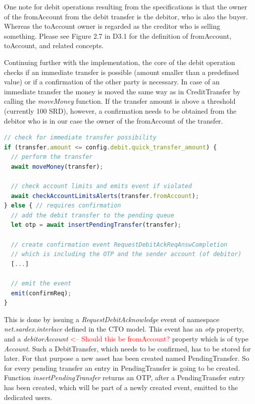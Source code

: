 One note for debit operations resulting from the specifications is that the owner of the fromAccount from the debit transfer is the debitor, who is also the buyer. Whereas the toAccount owner is regarded as the creditor who is selling something. Please see Figure 2.7 in D3.1 \cite{INTERLACE_D31} for the definition of fromAccount, toAccount, and related concepts.

Continuing further with the implementation, the core of the debit operation checks if an immediate transfer is possible (amount smaller than a predefined value) or if a confirmation of the other party is necessary. In case of an immediate transfer the money is moved the same way as in CreditTransfer by calling the \textit{moveMoney} function. If the transfer amount is above a threshold (currently 100 SRD), however, a confirmation needs to be obtained from the debitor who is in our case the owner of the fromAccount of the transfer.

\begin{center}
\begin{minipage}{0.8\textwidth}
\small
\begin{lstlisting}[language=javascript,firstnumber=1,caption={\bf\small DebitTransfer JavaScript}, captionpos=b,label=lst:js-debittransfer]
// check for immediate transfer possibility
if (transfer.amount <= config.debit.quick_transfer_amount) {
  // perform the transfer
  await moveMoney(transfer);

  // check account limits and emits event if violated
  await checkAccountLimitsAlerts(transfer.fromAccount);
} else { // requires confirmation
  // add the debit transfer to the pending queue
  let otp = await insertPendingTransfer(transfer);

  // create confirmation event RequestDebitAckReqAnswCompletion
  // which is including the OTP and the sender account (of debitor)
  [...]

  // emit the event
  emit(confirmReq);
}
\end{lstlisting}
\end{minipage}
\end{center}

This is done by issuing a \textit{RequestDebitAcknowledge} event of namespace \textit{net.sardex.interlace} defined in the CTO model. This event has an \textit{otp} property, and a \textit{debitorAccount} \textcolor{red}{<-- Should this be fromAccount?} property which is of type \textit{Account}. Such a DebitTransfer, which needs to be confirmed, has to be stored for later. For that purpose a new asset has been created named PendingTransfer. So for every pending transfer an entry in PendingTransfer is going to be created. Function \textit{insertPendingTransfer} returns an OTP, after a PendingTransfer entry has been created, which will be part of a newly created event, emitted to the dedicated users.

